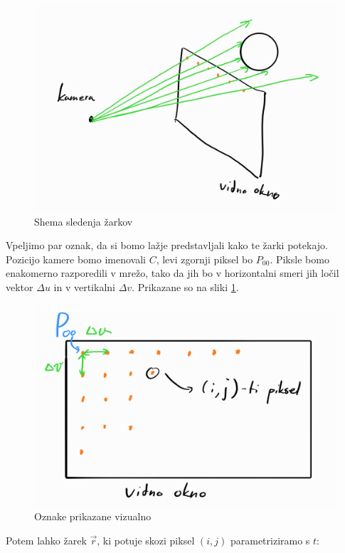 \documentclass[12pt, a4paper]{article}
\begin{document}
\begin{figure}[H]
	\includegraphics[width=\textwidth]{shema_zarki}
	\caption{Shema sledenja žarkov}
\end{figure}

Vpeljimo par oznak, da si bomo lažje predstavljali kako te žarki potekajo. Pozicijo kamere bomo imenovali $C$,
levi zgornji piksel bo $P_{00}$. Piksle bomo enakomerno razporedili v mrežo, tako da jih bo v horizontalni
smeri jih ločil vektor $\Delta u$ in v vertikalni $\Delta v$. Prikazane so na sliki \ref{fig:oznake}.

\begin{figure}[h]
	\centering
	\includegraphics[width=\textwidth]{vidno_okno}
	\caption{Oznake prikazane vizualno}
	\label{fig:oznake}
\end{figure}

Potem lahko žarek $\vec{r}$, ki potuje skozi piksel $(i,j)$ parametriziramo s $t$:
\end{document}
